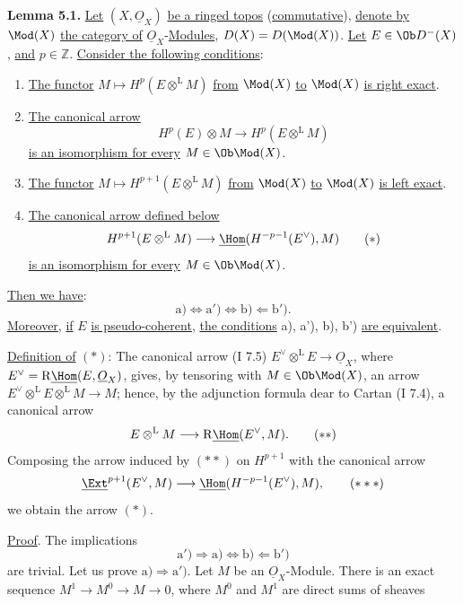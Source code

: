 \textbf{Lemma 5.1.} \uline{Let} \((X,\underline{O}_X)\) \uline{be a ringed topos} (\uline{commutative}), \uline{denote by} \(\Mod(X)\) \uline{the category of} \(\underline{O}_X\)-\uline{Modules}, \(D(X)=D(\Mod(X))\). \uline{Let} \(E\in\Ob D^-(X)\), \uline{and} \(p\in\mathbb Z\). \uline{Consider the following conditions}:
%
\begin{enumerate}[label=\alph*)]
\item \uline{The functor} \(M\mapsto H^p(E\otimes^{\mathrm L}M)\) \uline{from} \(\Mod(X)\) \uline{to} \(\Mod(X)\) \uline{is right exact}.
\item[a')] \uline{The canonical arrow}
\[
 H^p(E)\otimes M\longrightarrow H^p(E\otimes^{\mathrm L}M)
\]
\uline{is an isomorphism for every} \(M\in\Ob\Mod(X)\).
\item[b)] \uline{The functor} \(M\mapsto H^{p+1}(E\otimes^{\mathrm L}M)\) \uline{from} \(\Mod(X)\) \uline{to} \(\Mod(X)\) \uline{is left exact}.
\item[b')] \uline{The canonical arrow defined below}
\begin{equation}
 H^{p+1}(E\otimes^{\mathrm L}M)\longrightarrow\underline{\Hom}(H^{-p-1}(E^{\vee}),M)\tag{$*$}
\end{equation}
\uline{is an isomorphism for every} \(M\in\Ob\Mod(X)\).
\end{enumerate}
\uline{Then we have}:
\[
 \mathrm a)\Longleftrightarrow\mathrm a')\Longleftrightarrow\mathrm b)\Longleftarrow\mathrm b').
\]
\uline{Moreover}, \uline{if} \(E\) \uline{is pseudo-coherent}, \uline{the conditions} a), a'), b), b') \uline{are equivalent}.

\uline{Definition of} \((*)\): The canonical arrow (I 7.5) \(E^{\vee}\otimes^{\mathrm L}E\longrightarrow\underline{O}_X\), where \(E^{\vee}=\mathrm R\underline{\Hom}(E,\underline{O}_X)\), gives, by tensoring with \(M\in\Ob\Mod(X)\), an arrow \(E^{\vee}\otimes^{\mathrm L}E\otimes^{\mathrm L}M\longrightarrow M\); hence, by the adjunction formula dear to Cartan (I 7.4), a canonical arrow
\begin{equation}
 E\otimes^{\mathrm L}M\longrightarrow\mathrm R\underline{\Hom}(E^{\vee},M).\tag{$**$}
\end{equation}
Composing the arrow induced by \((**)\) on \(H^{p+1}\) with the canonical arrow
\begin{equation}
 \underline{\Ext}^{p+1}(E^{\vee},M)\longrightarrow\underline{\Hom}(H^{-p-1}(E^{\vee}),M),\tag{$***$}
\end{equation}
we obtain the arrow \((*)\).

\uline{Proof}. The implications
\[
 \mathrm a')\Longrightarrow\mathrm a)\Longleftrightarrow\mathrm b)\Longleftarrow\mathrm b')
\]
are trivial. Let us prove \(\mathrm a)\Longrightarrow\mathrm a')\). Let \(M\) be an \(\underline{O}_X\)-Module. There is an exact sequence \(M^1\longrightarrow M^0\longrightarrow M\longrightarrow0\), where \(M^0\) and \(M^1\) are direct sums of sheaves
